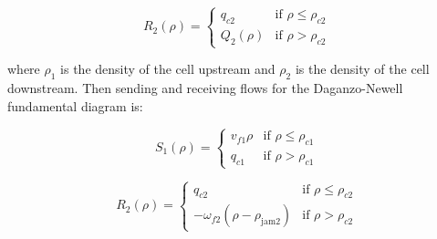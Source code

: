 \documentclass[11pt]{article}
\numberwithin{equation}{section}
\numberwithin{figure}{section}
\numberwithin{table}{section}
\begin{document}
\begin{equation} \label{eq:receivingFlow1}
R_{2}(\rho) = \begin{cases}
q_{c2} & \text{if } \rho \leq \rho_{c2} \\
Q_{2}(\rho) &  \text{if } \rho > \rho_{c2}
\end{cases}
\end{equation}

\noindent where $\rho_{1}$ is the density of the cell upstream and $\rho_{2}$ is the density of the cell downstream. Then sending and receiving flows for the Daganzo-Newell fundamental diagram is:

\begin{equation} \label{eq:sendingFlow2}
S_{1}(\rho) = \begin{cases}
v_{f1}\rho & \text{if } \rho \leq \rho_{c1} \\
q_{c1} &  \text{if } \rho > \rho_{c1}
\end{cases}
\end{equation}

\begin{equation} \label{eq:receivingFlow2}
R_{2}(\rho) = \begin{cases}
q_{c2} & \text{if } \rho \leq \rho_{c2} \\
-\omega_{f2} \left( \rho - \rho_{\text{jam}2} \right) & \text{if } \rho > \rho_{c2}
\end{cases}
\end{equation}
\end{document}
